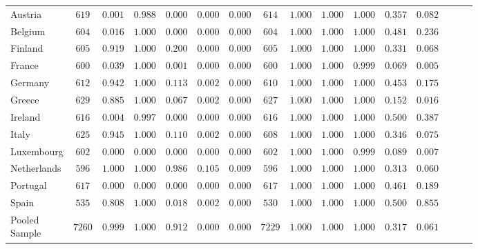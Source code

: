 \documentclass[20pt, margin=1in,innermargin=-4.5in,blockverticalspace=-0.25in]{tikzposter}
\begin{document}
\begin{columns}
{\begin{center}
{\begin{tabular}{|l|c|c|c|c|c|c|c|c|c|c|c|c|c|c|c|}
\hline
Austria&$ 619$&$0.001$&$0.988$&$0.000$&$0.000$&$0.000$&$ 614$&$1.000$&$1.000$&$1.000$&$0.357$&$0.082$\\
Belgium&$ 604$&$0.016$&$1.000$&$0.000$&$0.000$&$0.000$&$ 604$&$1.000$&$1.000$&$1.000$&$0.481$&$0.236$\\
Finland&$ 605$&$0.919$&$1.000$&$0.200$&$0.000$&$0.000$&$ 605$&$1.000$&$1.000$&$1.000$&$0.331$&$0.068$\\
France&$ 600$&$0.039$&$1.000$&$0.001$&$0.000$&$0.000$&$ 600$&$1.000$&$1.000$&$0.999$&$0.069$&$0.005$\\
Germany&$ 612$&$0.942$&$1.000$&$0.113$&$0.002$&$0.000$&$ 610$&$1.000$&$1.000$&$1.000$&$0.453$&$0.175$\\
Greece&$ 629$&$0.885$&$1.000$&$0.067$&$0.002$&$0.000$&$ 627$&$1.000$&$1.000$&$1.000$&$0.152$&$0.016$\\
Ireland&$ 616$&$0.004$&$0.997$&$0.000$&$0.000$&$0.000$&$ 616$&$1.000$&$1.000$&$1.000$&$0.500$&$0.387$\\
Italy&$ 625$&$0.945$&$1.000$&$0.110$&$0.002$&$0.000$&$ 608$&$1.000$&$1.000$&$1.000$&$0.346$&$0.075$\\
Luxembourg&$ 602$&$0.000$&$0.000$&$0.000$&$0.000$&$0.000$&$ 602$&$1.000$&$1.000$&$0.999$&$0.089$&$0.007$\\
Netherlands&$ 596$&$1.000$&$1.000$&$0.986$&$0.105$&$0.009$&$ 596$&$1.000$&$1.000$&$1.000$&$0.313$&$0.060$\\
Portugal&$ 617$&$0.000$&$0.000$&$0.000$&$0.000$&$0.000$&$ 617$&$1.000$&$1.000$&$1.000$&$0.461$&$0.189$\\
Spain&$ 535$&$0.808$&$1.000$&$0.018$&$0.002$&$0.000$&$ 530$&$1.000$&$1.000$&$1.000$&$0.500$&$0.855$\\
\hline
Pooled Sample&$7260$&$0.999$&$1.000$&$0.912$&$0.000$&$0.000$&$7229$&$1.000$&$1.000$&$1.000$&$0.317$&$0.061$\\
\hline
\end{tabular}

}

\end{center}

 }


\end{columns}
\end{document}
